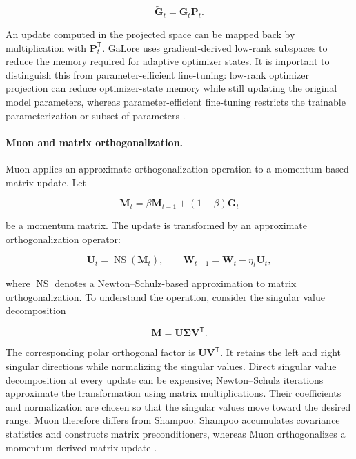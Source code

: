 \begin{equation}
    \widetilde{\mathbf{G}}_t
    =
    \mathbf{G}_t\mathbf{P}_t.
    \label{eq:opt-low-rank-projection}
\end{equation}

An update computed in the projected space can be mapped back by
multiplication with $\mathbf{P}_t^{\mathsf{T}}$. GaLore uses
gradient-derived low-rank subspaces to reduce the memory required
for adaptive optimizer states. It is important to distinguish this
from parameter-efficient fine-tuning: low-rank optimizer projection
can reduce optimizer-state memory while still updating the original
model parameters, whereas parameter-efficient fine-tuning restricts
the trainable parameterization or subset of parameters
\parencite{Ranganath2026Navigating,Vyas2025SOAP}.

\paragraph{Muon and matrix orthogonalization.}
Muon applies an approximate orthogonalization operation to a
momentum-based matrix update. Let

\begin{equation}
    \mathbf{M}_t
    =
    \beta\mathbf{M}_{t-1}
    +(1-\beta)\mathbf{G}_t
    \label{eq:opt-muon-momentum}
\end{equation}

be a momentum matrix. The update is transformed by an approximate
orthogonalization operator:

\begin{equation}
    \mathbf{U}_t
    =
    \operatorname{NS}(\mathbf{M}_t),
    \qquad
    \mathbf{W}_{t+1}
    =
    \mathbf{W}_t-\eta_t\mathbf{U}_t,
    \label{eq:opt-muon-update}
\end{equation}

where $\operatorname{NS}$ denotes a Newton--Schulz-based
approximation to matrix orthogonalization. To understand the
operation, consider the singular value decomposition

\begin{equation}
    \mathbf{M}
    =
    \mathbf{U}\boldsymbol{\Sigma}\mathbf{V}^{\mathsf{T}}.
    \label{eq:opt-muon-svd}
\end{equation}

The corresponding polar orthogonal factor is
$\mathbf{U}\mathbf{V}^{\mathsf{T}}$. It retains the left and right
singular directions while normalizing the singular values. Direct
singular value decomposition at every update can be expensive;
Newton--Schulz iterations approximate the transformation using
matrix multiplications. Their coefficients and normalization are
chosen so that the singular values move toward the desired range.
Muon therefore differs from Shampoo: Shampoo accumulates covariance
statistics and constructs matrix preconditioners, whereas Muon
orthogonalizes a momentum-derived matrix update
\parencite{Ranganath2026Navigating,Wen2026Fantastic}.

